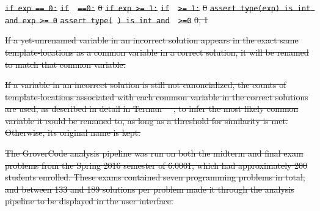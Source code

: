 \documentclass[12pt,twoside]{mitthesis}
\providecommand{\DIFdeltex}[1]{{\protect\color{red}\sout{#1}}}                      %
\providecommand{\DIFdelFL}[1]{\DIFdel{#1}} %
\providecommand{\DIFdel}[1]{\texorpdfstring{\DIFdeltex{#1}}{}} %
\begin{document}
{{{{{{{{{{%
\texttt{\DIFdelFL{if exp == 0:}} %
\texttt{\DIFdelFL{if }\underline{\DIFdelFL{\hspace{1em}}}%
\DIFdelFL{==0:}} %
\DIFdelFL{0 }%
\texttt{\DIFdelFL{if exp >= 1:}} %
\texttt{\DIFdelFL{if }\underline{\DIFdelFL{\hspace{1em}}} %
\DIFdelFL{>= 1:}} %
\DIFdelFL{0 }%
\texttt{\DIFdelFL{assert type(exp) is int and exp >= 0}} %
\texttt{\DIFdelFL{assert type(}\underline{\DIFdelFL{\hspace{1em}}}%
\DIFdelFL{) is int and }\underline{\DIFdelFL{\hspace{1em}}}%
\DIFdelFL{>=0}} %
\DIFdelFL{0, 1 }%

\DIFdel{If a yet-unrenamed variable in an incorrect solution appears in the exact same template-locations as a common variable in a correct solution, it will be renamed to match that common variable.
}%

\DIFdel{If a variable in an incorrect solution is still not canoncialized, the counts of template-locations associated with each common variable in the correct solutions are used, as described in detail in Terman~\mbox{%
\cite{staceythesis}}%
, to infer the most likely common variable it could be renamed to, as long as a threshold for similarity is met. Otherwise, its original name is kept. 
}%


\DIFdel{The GroverCode analysis pipeline was run on both the midterm and final exam problems from the Spring 2016 semester of 6.0001, which had approximately 200 students enrolled. These exams contained seven programming problems in total, and between 133 and 189 solutions per problem made it through the analysis pipeline to be displayed in the user interface. 
}%

}}}}}}}}}}
\end{document}
